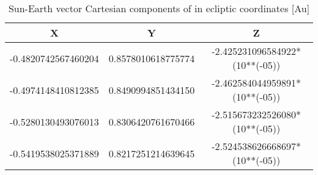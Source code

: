\documentclass[letterpaper,12pt]{article}
\begin{document}
\FloatBarrier
\begin{table}[h!]
\caption{Sun-Earth vector Cartesian components of  in ecliptic coordinates [Au]} %
\centering %
\begin{tabular}{c c c } %
\hline\hline %
X & Y & Z \\ [0.5ex] %
\hline %
-0.4820742567460204  & 0.8578010618775774  &  -2.425231096584922*(10**(-05))  \\
-0.4974148410812385  & 0.8490994851434150  &  -2.462584044959891*(10**(-05)) \\
-0.5280130493076013  & 0.8306420761670466  &  -2.515673232526080*(10**(-05)) \\ 
-0.5419538025371889  & 0.8217251214639645  &  -2.524538626668697*(10**(-05))  \\ [1ex] %
\hline %
\end{tabular}
\label{table:nonlin} %
\end{table}
\FloatBarrier



\end{document}
